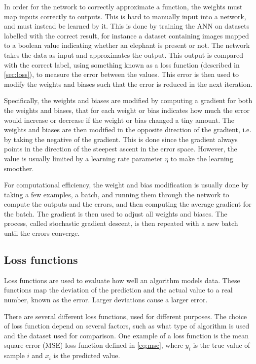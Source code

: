 \documentclass{kththesis}
\begin{document}
In order for the network to correctly approximate a function, the weights must map inputs correctly to outputs. This is hard to manually input into a network, and must instead be learned by it. This is done by training the ANN on datasets labelled with the correct result, for instance a dataset containing images mapped to a boolean value indicating whether an elephant is present or not. The network takes the data as input and approximates the output. This output is compared with the correct label, using something known as a loss function (described in \autoref{sec:loss}), to measure the error between the values. This error is then used to modify the weights and biases such that the error is reduced in the next iteration. \parencite{lecun2015deep} 

Specifically, the weights and biases are modified by computing a gradient for both the weights and biases, that for each weight or bias indicates how much the error would increase or decrease if the weight or bias changed a tiny amount. The weights and biases are then modified in the opposite direction of the gradient, i.e. by taking the negative of the gradient. This is done since the gradient always points in the direction of the steepest ascent in the error space. However, the value is usually limited by a learning rate parameter $\eta$ to make the learning smoother. \parencite{lecun2015deep}

For computational efficiency, the weight and bias modification is usually done by taking a few examples, a batch, and running them through the network to compute the outputs and the errors, and then computing the average gradient for the batch. The gradient is then used to adjust all weights and biases. The process, called stochastic gradient descent, is then repeated with a new batch until the errors converge. \parencite{bottou2010large}

\subsection{Loss functions}
\label{sec:loss}
Loss functions are used to evaluate how well an algorithm models data. These functions map the deviation of the prediction and the actual value to a real number, known as the error. Larger deviations cause a larger error.

There are several different loss functions, used for different purposes. The choice of loss function depend on several factors, such as what type of algorithm is used and the dataset used for comparison. One example of a loss function is the mean square error (MSE) loss function defined in \autoref{eq:mse}, where $y_i$ is the true value of sample $i$ and $x_i$ is the predicted value. \parencite{CommonLo62:online}
\end{document}
